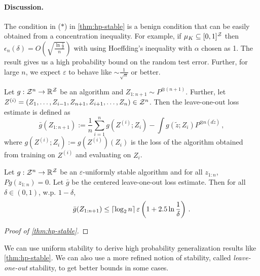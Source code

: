 \documentclass[twoside]{article}
\begin{document}
\paragraph{Discussion.}
The condition in ($\ast$) in \cref{thm:hp-stable} is a benign condition that can be easily obtained from a concentration inequality. For example, if $\mu_K \subseteq [0,1]^{\mathcal{Z}}$ then $\epsilon_n(\delta) = O\left( \sqrt{\frac{\ln\frac{1}{\delta}}{n}} \right)$ with using Hoeffding's inequality with $\alpha$ chosen as 1. The result gives us a high probability bound on the random test error. Further, for large $n$, we expect $\varepsilon$ to behave like $\sim \frac{1}{\sqrt{n}}$ or better.

\begin{definition}
    Let $g: \mathcal{Z}^n \to \mathbb{R}^{\mathcal{Z}}$ be an algorithm and $Z_{1:n+1} \sim P^{\otimes (n+1)}$. Further, let $Z^{(i)} = (Z_1, \dots, Z_{i-1}, Z_{n+1}, Z_{i+1}, \dots, Z_n) \in \mathcal{Z}^n$. Then the leave-one-out loss estimate is defined as
    \[
        \bar{g}(Z_{1:n+1}) := \frac1n \sum_{i=1}^n g(Z^{(i)}; Z_i) - \int g(\tilde z; Z_i) P^{\otimes n (d\tilde z)} \,, 
    \]
    where $g(Z^{(i)}; Z_i) := g(Z^{(i)})(Z_i)$ is the loss of the algorithm obtained from training on $Z^{(i)}$ and evaluating on $Z_i$.   
\end{definition}

\begin{lemma}
    Let $g: \mathcal{Z}^n \to \mathbb{R}^{\mathcal{Z}}$ be an $\varepsilon$-uniformly stable algorithm and for all $z_{1:n}$, $Pg(z_{1:n}) = 0$. Let $\bar g$ be the centered leave-one-out loss estimate. Then for all $\delta \in (0,1)$, w.p. $1-\delta$,
    \[
        \bar{g}(Z_{1:n+1}) \le \left\lceil {\log_2 n} \right\rceil \varepsilon \left( 1 + 2.5 \ln\frac{1}{\delta} \right) \,.
    \]
\end{lemma}
\begin{proof}[Proof of \cref{thm:hp-stable}]
    
\end{proof}

We can use uniform stability to derive high probability generalization results like \cref{thm:hp-stable}. We can also use a more refined notion of stability, called \emph{leave-one-out} stability, to get better bounds in some cases. 
 
\end{document}
